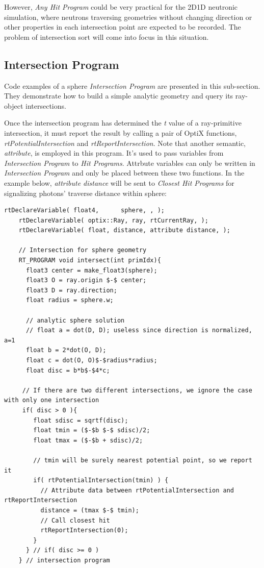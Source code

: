 However, \textit{Any Hit Program} could be very practical for the 2D1D neutronic simulation, where neutrons traversing geometries without changing direction or other properties in each intersection point are expected to be recorded. The problem of intersection sort will come into focus in this situation.


\subsection{Intersection Program}
Code examples of a sphere \textit{Intersection Program} are presented in this sub-section. They demonstrate how to build a simple analytic geometry and query its ray-object intersections. 

Once the intersection program has determined the \textit{t} value of a ray-primitive intersection, it must report the result by calling a pair of OptiX functions, \textit{rtPotentialIntersection} and \textit{rtReportIntersection}. Note that another semantic, \textit{attribute}, is employed in this program. It's used to pass variables from \textit{Intersection Program} to \textit{Hit Programs}. Attrbute variables can only be written in \textit{Intersection Program} and only be placed between these two functions. In the example below, \textit{attribute distance} will be sent to \textit{Closest Hit Programs} for signalizing photons' traverse distance within sphere: 
\begin{lstlisting}[mathescape]
    rtDeclareVariable( float4,		sphere, , );
    rtDeclareVariable( optix::Ray, ray,	rtCurrentRay, );
    rtDeclareVariable( float, distance,	attribute distance, );

    // Intersection for sphere geometry
    RT_PROGRAM void intersect(int primIdx){
      float3 center = make_float3(sphere);
      float3 O = ray.origin $-$ center;
      float3 D = ray.direction;
      float radius = sphere.w;

      // analytic sphere solution
      // float a = dot(D, D); useless since direction is normalized, a=1
      float b = 2*dot(O, D);
      float c = dot(O, O)$-$radius*radius;
      float disc = b*b$-$4*c;

     // If there are two different intersections, we ignore the case with only one intersection
     if( disc > 0 ){
        float sdisc = sqrtf(disc);
        float tmin = ($-$b $-$ sdisc)/2;
        float tmax = ($-$b + sdisc)/2;

        // tmin will be surely nearest potential point, so we report it
        if( rtPotentialIntersection(tmin) ) {
          // Attribute data between rtPotentialIntersection and rtReportIntersection
          distance = (tmax $-$ tmin);
          // Call closest hit
          rtReportIntersection(0);
        } 
      } // if( disc >= 0 )
    } // intersection program
\end{lstlisting}

